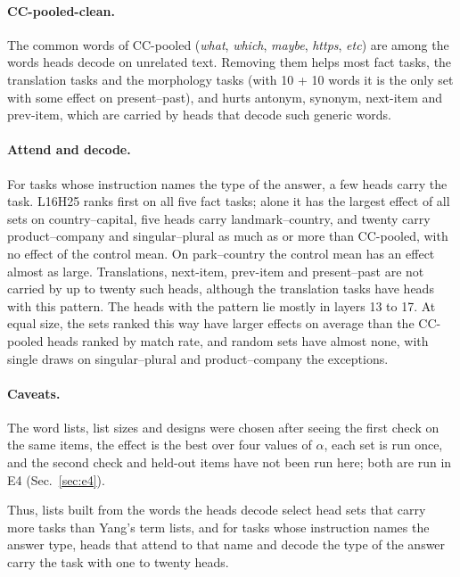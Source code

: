 \documentclass[11pt,a4paper]{article}
\begin{document}
\paragraph{CC-pooled-clean.} The common words of CC-pooled (\emph{what}, \emph{which}, \emph{maybe}, \emph{https}, \emph{etc}) are among the words heads decode on unrelated text. Removing them helps most fact tasks, the translation tasks and the morphology tasks (with 10 + 10 words it is the only set with some effect on present--past), and hurts antonym, synonym, next-item and prev-item, which are carried by heads that decode such generic words.

\paragraph{Attend and decode.} For tasks whose instruction names the type of the answer, a few heads carry the task. L16H25 ranks first on all five fact tasks; alone it has the largest effect of all sets on country--capital, five heads carry landmark--country, and twenty carry product--company and singular--plural as much as or more than CC-pooled, with no effect of the control mean. On park--country the control mean has an effect almost as large. Translations, next-item, prev-item and present--past are not carried by up to twenty such heads, although the translation tasks have heads with this pattern. The heads with the pattern lie mostly in layers 13 to 17. At equal size, the sets ranked this way have larger effects on average than the CC-pooled heads ranked by match rate, and random sets have almost none, with single draws on singular--plural and product--company the exceptions.

\paragraph{Caveats.} The word lists, list sizes and designs were chosen after seeing the first check on the same items, the effect is the best over four values of $\alpha$, each set is run once, and the second check and held-out items have not been run here; both are run in E4 (Sec.~\ref{sec:e4}).

Thus, lists built from the words the heads decode select head sets that carry more tasks than Yang's term lists, and for tasks whose instruction names the answer type, heads that attend to that name and decode the type of the answer carry the task with one to twenty heads.

\begin{table}[H]
\centering\footnotesize\setlength{\tabcolsep}{4pt}

\caption{Head sets from decoded words, J-head, rule style, first causal check: highest accuracy over $\alpha\in\{1,2,4,8\}$, rule-style means averaged over the five templates. E1: E1's J-head rule-style set over the same $\alpha$. A+D $N$: the $N$ heads ranked first by attention to task words times decode rate. Random 5: mean of the two layer-matched random sets of A+D 5. Bold: the largest of the six head sets.}
\label{tab:words}
\end{table}
\end{document}
